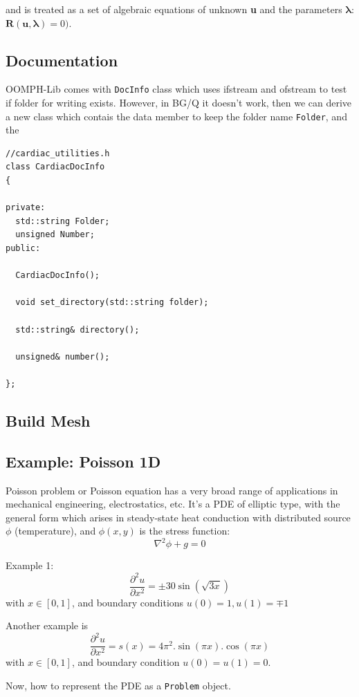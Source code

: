 and is treated as a set of algebraic
equations of unknown {\bf u} and the parameters $\mathbf{\lambda}$:
$\mathbf{R(u,\lambda)}=0)$.

\subsection{Documentation}

OOMPH-Lib comes with \verb!DocInfo! class which uses ifstream and ofstream to
test if folder for writing exists. However, in BG/Q it doesn't work, then we can
derive a new class which contais the data member to keep the folder name
\verb!Folder!, and the 
\begin{lstlisting}
//cardiac_utilities.h
class CardiacDocInfo
{

private:
  std::string Folder;
  unsigned Number;
public:

  CardiacDocInfo();

  void set_directory(std::string folder);

  std::string& directory();

  unsigned& number();

};
\end{lstlisting}




\subsection{Build Mesh}
\label{sec:oomph_mesh}

\subsection{Example: Poisson 1D}

Poisson problem or Poisson equation has a very broad range of applications in
mechanical engineering, electrostatics, etc. It's a PDE of elliptic type, with
the general form which arises in steady-state heat conduction with distributed
source $\phi$ (temperature), and $\phi(x,y)$ is the stress function:
\begin{equation}
\nabla^2\phi + g = 0
\end{equation}

Example 1:
\begin{equation}
\frac{\partial^2 u}{\partial x^2} = \pm 30\sin(\sqrt{3x})
\end{equation}
with $x\in [0,1]$, and boundary conditions $u(0)=1, u(1)=\mp 1$

Another example is
\begin{equation}
\frac{\partial^2 u}{\partial x^2}= s(x) = 4\pi^2.\sin(\pi x).\cos(\pi x)
\end{equation}
with $x\in [0,1]$, and boundary condition $u(0)=u(1)=0$.

Now, how to represent the PDE as a \verb!Problem! object.
